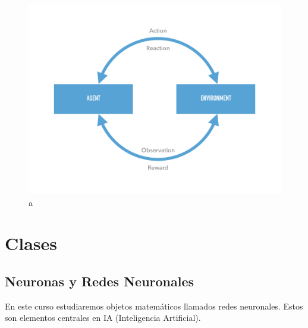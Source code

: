 \documentclass[12pt,a4paper]{book}
\begin{document}
\begin{figure}[hbtp]
\centering
\includegraphics[scale=0.2]{Graficas/DL_1.jpg}
\caption{a}
\end{figure}
\part{Clases}
\chapter{Neuronas y Redes Neuronales}
  
En este curso estudiaremos objetos matemáticos llamados redes neuronales. Estos son elementos centrales en IA (Inteligencia Artificial).
\end{document}
